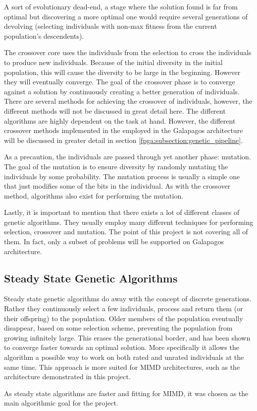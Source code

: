 A sort of evolutionary dead-end, a stage where the solution found is far from optimal but discovering a more optimal one would require several generations of devolving (selecting individuals with non-max fitness from the current population's descendents).

The crossover core uses the individuals from the selection to cross the individuals to produce new individuals.
Because of the initial diversity in the initial population, this will cause the diversity to be large in the beginning.
However they will eventually converge.
The goal of the crossover phase is to converge against a solution by continuously creating a better generation of individuals.
There are several methods for achieving the crossover of individuals, however, the different methods will not be discussed in great detail here.
The different algorithms are highly dependent on the task at hand.
However, the different crossover methods implemented in the employed in the Galapagos architecture will be discussed in greater detail in section \vref{fpga:subsection:genetic_pipeline}.

As a precaution, the individuals are passed through yet another phase: mutation.
The goal of the mutation is to ensure diversity by randomly mutating the individuals by some probability.
The mutation process is usually a simple one that just modifies some of the bits in the individual.
As with the crossover method, algorithms also exist for performing the mutation.


Lastly, it is important to mention that there exists a lot of different classes of genetic algorithms.
They usually employ many different techniques for performing selection, crossover and mutation.
The point of this project is not covering all of them.
In fact, only a subset of problems will be supported on Galapagos architecture.



\subsection{Steady State Genetic Algorithms}
Steady state genetic algorithms do away with the concept of discrete generations.
Rather they continuously select a few individuals, process and return them (or their offspring) to the population.
Older members of the population eventually disappear, based on some selection scheme, preventing the population from growing infinitely large.
This erases the generational border, and has been shown to converge faster towards an optimal solution.
More specifically it allows the algorithm a possible way to work on both rated and unrated individuals at the same time.\cite{steady-state}
This approach is more suited for MIMD architectures, such as the architecture demonstrated in this project.

As steady state algorithms are faster and fitting for MIMD, it was chosen as the main algorithmic goal for the project.


